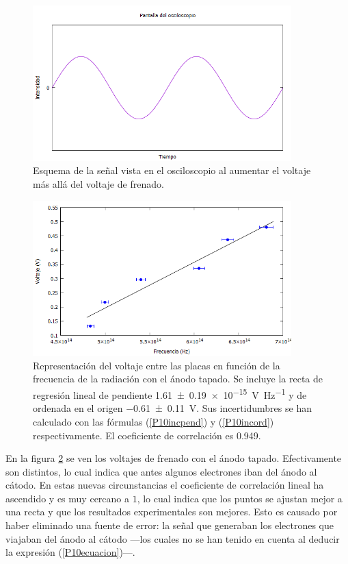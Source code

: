 \documentclass[12pt]{article}
\numberwithin{table}{section}
\numberwithin{figure}{section}
\numberwithin{equation}{section}
\newcommand{\data}[3]{\SI{#1 \pm #2}{#3}}
\begin{document}
\begin{figure}[!ht]
	\begin{center}
		\includegraphics[width=10cm]{P10Sinusoide.png}
		\caption{Esquema de la señal vista en el osciloscopio al aumentar el voltaje más allá del voltaje de frenado.}
		\label{P10sinusoide}
	\end{center}
\end{figure}
\begin{figure}[!ht]
	\begin{center}
		\includegraphics[width=10cm]{P10Anodotapado.png}
		\caption{Representación del voltaje entre las placas en función de la frecuencia de la radiación con el ánodo tapado. Se incluye la recta de regresión lineal de pendiente \data{1.61}{0.19e-15}{V Hz^{-1}} y de ordenada en el origen \data{-0.61}{0.11}{V}. Sus incertidumbres se han calculado con las fórmulas (\ref{P10incpend}) y (\ref{P10incord}) respectivamente. El coeficiente de correlación es \num{0.949}.}
		\label{P10anodotapado}
	\end{center}
\end{figure}

En la figura \ref{P10anodotapado} se ven los voltajes de frenado con el ánodo tapado. Efectivamente son distintos, lo cual indica que antes algunos electrones iban del ánodo al cátodo. En estas nuevas circunstancias el coeficiente de correlación lineal ha ascendido y es muy cercano a $1$, lo cual indica que los puntos se ajustan mejor a una recta y que los resultados experimentales son mejores. Esto es causado por haber eliminado una fuente de error: la señal que generaban los electrones que viajaban del ánodo al cátodo ---los cuales no se han tenido en cuenta al deducir la expresión (\ref{P10ecuacion})---.
\end{document}
